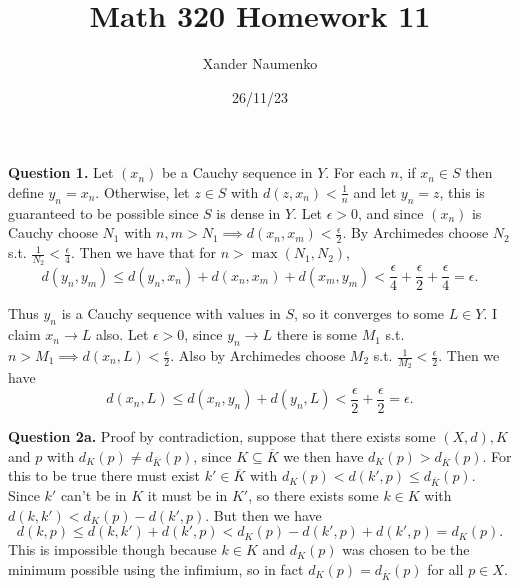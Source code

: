 \documentclass[letterpaper, reqno,11pt]{article}
\begin{document}
\title{Math 320 Homework 11}
\date{26/11/23}
\author{Xander Naumenko}
\maketitle

{\medskip\noindent\bf Question 1.} Let $(x_n)$ be a Cauchy sequence in $Y$. For each $n$, if $x_n\in S$ then define $y_n=x_n$. Otherwise, let $z\in S$ with $d(z,x_n)<\frac{1}{n}$ and let $y_n=z$, this is guaranteed to be possible since $S$ is dense in $Y$. Let $\epsilon>0$, and since $(x_n)$ is Cauchy choose $N_1$ with $n,m>N_1\implies d(x_n,x_m)<\frac{\epsilon}{2}$. By Archimedes choose $N_2$ s.t. $\frac{1}{N_2}<\frac{\epsilon}{4}$. Then we have that for $n>\max(N_1,N_2)$,
\[
d(y_n,y_m)\leq d(y_n,x_n)+d(x_n,x_m)+d(x_m,y_m)<\frac{\epsilon}{4}+\frac{\epsilon}{2}+\frac{\epsilon}{4}=\epsilon
.\]

Thus $y_n$ is a Cauchy sequence with values in $S$, so it converges to some $L\in Y$. I claim $x_n\to L$ also. Let $\epsilon>0$, since $y_n\to L$ there is some $M_1$ s.t. $n>M_1\implies d(x_n,L)<\frac{\epsilon}{2}$. Also by Archimedes choose $M_2$ s.t. $\frac{1}{M_2}<\frac{\epsilon}{2}$. Then we have
\[
d(x_n,L)\leq d(x_n,y_n)+d(y_n,L)< \frac{\epsilon}{2}+\frac{\epsilon}{2}=\epsilon
.\]

\newpage\phantom{blabla}
\newpage

{\medskip\noindent\bf Question 2a.} Proof by contradiction, suppose that there exists some $(X,d),K$ and $p$ with $d_K(p)\neq d_{\overline{K}}(p)$, since $K\subseteq \overline{K}$ we then have $d_K(p)> d_{\overline{K}}(p)$. For this to be true there must exist $k'\in \overline{K}$ with $d_{K}(p)<d(k',p)\leq d_{\overline{K}}(p)$. Since $k'$ can't be in $K$ it must be in $K'$, so there exists some $k\in K$ with $d(k,k')<d_{K}(p)-d(k',p)$. But then we have
\[
d(k,p)\leq d(k,k')+d(k',p)<d_{K}(p)-d(k',p)+d(k',p)=d_{K}(p)
.\]
This is impossible though because $k\in K$ and $d_{K}(p)$ was chosen to be the minimum possible using the infimium, so in fact $d_{K}(p)=d_{\overline{K}}(p)$ for all $p\in X$.

\end{document}
